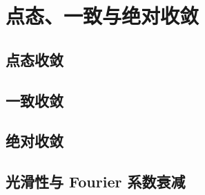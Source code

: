 \section{点态、一致与绝对收敛}
\label{b2:sec:0205}


\subsection{点态收敛}
\label{b2:subsec:020501}

\subsection{一致收敛}
\label{b2:subsec:020502}

\subsection{绝对收敛}
\label{b2:subsec:020503}

\subsection{光滑性与 Fourier 系数衰减}
\label{b2:subsec:020504}


